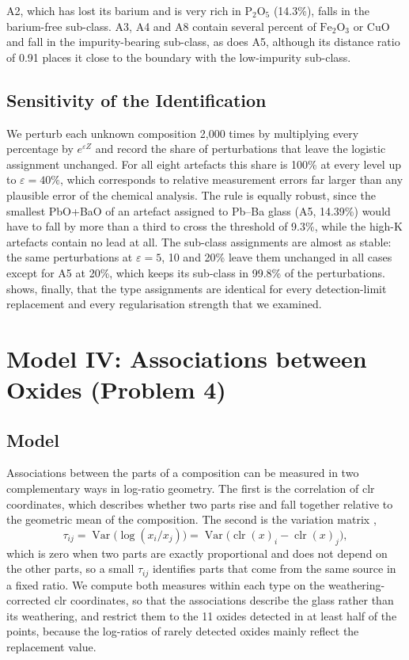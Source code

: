 \documentclass[11pt,a4paper]{article}
\newcommand{\clr}{\operatorname{clr}}
\newcommand{\ox}[1]{\ensuremath{\mathrm{#1}}}
\begin{document}
A2, which has lost its barium and is very rich in \ox{P_2O_5} (14.3\%), falls in the barium-free sub-class.
A3, A4 and A8 contain several percent of \ox{Fe_2O_3} or CuO and fall in the impurity-bearing sub-class, as does A5, although its distance ratio of 0.91 places it close to the boundary with the low-impurity sub-class.

\subsection{Sensitivity of the Identification}
We perturb each unknown composition 2{,}000 times by multiplying every percentage by $e^{\varepsilon Z}$ and record the share of perturbations that leave the logistic assignment unchanged.
For all eight artefacts this share is 100\% at every level up to $\varepsilon=40\%$, which corresponds to relative measurement errors far larger than any plausible error of the chemical analysis.
The rule is equally robust, since the smallest PbO+BaO of an artefact assigned to Pb--Ba glass (A5, 14.39\%) would have to fall by more than a third to cross the threshold of 9.3\%, while the high-K artefacts contain no lead at all.
The sub-class assignments are almost as stable: the same perturbations at $\varepsilon=5$, 10 and 20\% leave them unchanged in all cases except for A5 at 20\%, which keeps its sub-class in 99.8\% of the perturbations.
 shows, finally, that the type assignments are identical for every detection-limit replacement and every regularisation strength that we examined.

\section{Model IV: Associations between Oxides (Problem 4)}\label{sec:q4}

\subsection{Model}
Associations between the parts of a composition can be measured in two complementary ways in log-ratio geometry.
The first is the correlation of clr coordinates, which describes whether two parts rise and fall together relative to the geometric mean of the composition.
The second is the variation matrix \citep{aitchison1986},
\begin{equation}
\tau_{ij}=\operatorname{Var}\big(\log(x_i/x_j)\big)=\operatorname{Var}\big(\clr(x)_i-\clr(x)_j\big),
\end{equation}
which is zero when two parts are exactly proportional and does not depend on the other parts, so a small $\tau_{ij}$ identifies parts that come from the same source in a fixed ratio.
We compute both measures within each type on the weathering-corrected clr coordinates, so that the associations describe the glass rather than its weathering, and restrict them to the 11 oxides detected in at least half of the points, because the log-ratios of rarely detected oxides mainly reflect the replacement value.
\end{document}
